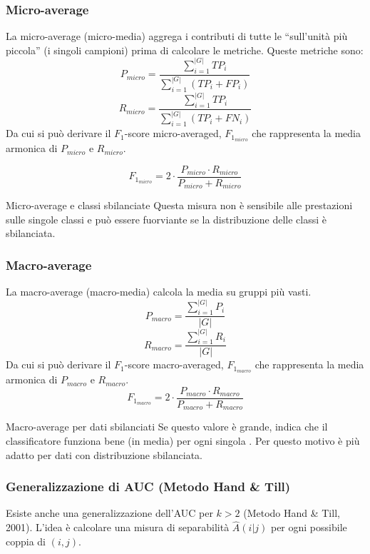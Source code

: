\subsubsection{Micro-average}
La micro-average (micro-media) aggrega i contributi di tutte le 
``sull'unità più piccola'' (i singoli campioni) prima di calcolare le
metriche.
Queste metriche sono:
\[
P_{micro}=\frac{\sum_{i=1}^{|G|}TP_{i}}{\sum_{i=1}^{|G|}(TP_{i}+FP_{i})}
\]
\[
R_{micro}=\frac{\sum_{i=1}^{|G|}TP_{i}}{\sum_{i=1}^{|G|}(TP_{i}+FN_{i})}
\]
Da cui si può derivare il $F_1$-score micro-averaged, $F_{1_{micro}}$
che rappresenta la media armonica di $P_{micro}$ e $R_{micro}$.

\[
F_{1_{micro}} = 2 \cdot \frac{P_{micro} \cdot R_{micro}}{P_{micro} + R_{micro}}
\]

\begin{nota}{Micro-average e classi sbilanciate}{}
Questa misura non è sensibile alle prestazioni sulle singole classi e può
essere fuorviante se la distribuzione delle classi è sbilanciata.
\end{nota}

\subsubsection{Macro-average}
La macro-average (macro-media) calcola la media su gruppi più vasti.
\[
P_{macro}=\frac{\sum_{i=1}^{|G|}P_{i}}{|G|}
\]
\[
R_{macro}=\frac{\sum_{i=1}^{|G|}R_{i}}{|G|}
\]
Da cui si può derivare il $F_1$-score macro-averaged, $F_{1_{macro}}$
che rappresenta la media armonica di $P_{macro}$ e $R_{macro}$.
\[
F_{1_{macro}} = 2 \cdot \frac{P_{macro} \cdot R_{macro}}{P_{macro} + R_{macro}}
\]

\begin{nota}{Macro-average per dati sbilanciati}{}
Se questo valore è grande, indica che il classificatore funziona bene
(in media) per ogni singola .
Per questo motivo è più adatto per dati con distribuzione sbilanciata.
\end{nota}

\subsubsection{Generalizzazione di AUC (Metodo Hand \& Till)}
Esiste anche una generalizzazione dell'AUC per $k > 2$  (Metodo Hand
\& Till, 2001).
L'idea è calcolare una misura di separabilità $\hat{A}(i|j)$
per ogni possibile coppia di  $(i, j)$.

